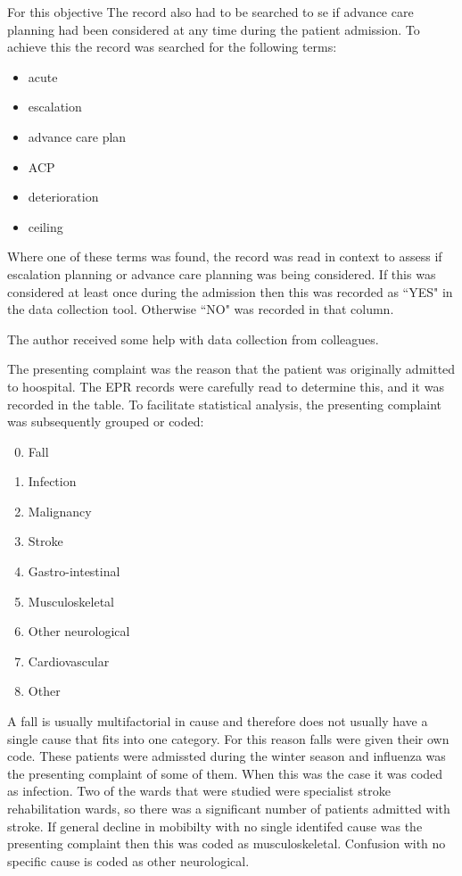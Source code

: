 \documentclass
[
	12pt,
	a4paper,
	oneside,
]{report}
\begin{document}
For this objective The record also had to be searched to se if advance care
planning had been considered at any time during the patient admission. To 
achieve this the record was searched for the following terms:

\begin{itemize}
\item acute
\item escalation
\item advance care plan
\item ACP
\item deterioration
\item ceiling
\end{itemize}

Where one of these terms was found, the record was read in context to assess if 
escalation planning or advance care planning was being considered. If this
was considered at least once during the admission then this was recorded as 
``YES"
in the data collection tool. Otherwise ``NO" was recorded in that column.

The author received some help with data collection from colleagues.

The presenting complaint was the reason that the patient was originally 
admitted to hoospital. The EPR records were carefully read to determine this,
and it was recorded in the table. To facilitate statistical analysis, the 
presenting complaint was subsequently grouped or coded:
\begin{enumerate}
\setcounter{enumi}{-1}
\item Fall
\item Infection
\item Malignancy
\item Stroke
\item Gastro-intestinal
\item Musculoskeletal
\item Other neurological
\item Cardiovascular
\item Other
\end{enumerate}

A fall is usually multifactorial in cause \parencite{silver:12} and therefore
does not usually have a single cause that fits into one category. For this 
reason falls were given their own code.
These patients were admissted during the winter season and influenza was the
presenting complaint of some of them. When this was the case it was coded as
infection. Two of the wards that were studied were specialist stroke 
rehabilitation wards, so there was a significant number of patients admitted
with stroke. If general decline in mobibilty with no single identifed cause
was the presenting complaint then this was coded as musculoskeletal.
Confusion with no specific cause is coded as other neurological.
\end{document}
